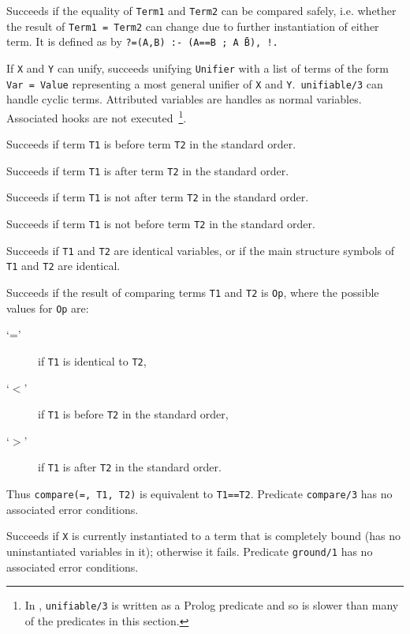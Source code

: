 \begin{description}
%
Succeeds if the equality of {\tt Term1} and {\tt Term2} can be
compared safely, i.e. whether the result of {\tt Term1 = Term2} can
change due to further instantiation of either term. It is defined as
by {\tt ?=(A,B) :- (A==B ; A \= B), !.} 

%
If {\tt X} and {\tt Y} can unify, succeeds unifying {\tt Unifier} with
a list of terms of the form {\tt Var = Value} representing a most
general unifier of {\tt X} and {\tt Y}.\  {\tt unifiable/3} can handle
cyclic terms. Attributed variables are handles as normal
variables. Associated hooks are not executed~\footnote{In \version ,
  {\tt unifiable/3} is written as a Prolog predicate and so is slower
  than many of the predicates in this section.}.

    Succeeds if term {\tt T1} is before term {\tt T2} in the standard order.

    Succeeds if term {\tt T1} is after term {\tt T2} in the standard order.

    Succeeds if term {\tt T1} is not after term {\tt T2} in the standard order.

    Succeeds if term {\tt T1} is not before term {\tt T2} in the standard order.

    Succeeds if {\tt T1} and {\tt T2} are identical variables, or if
    the main structure symbols of {\tt T1} and {\tt T2} are identical.

    Succeeds if the result of comparing terms {\tt T1} and {\tt T2} 
    is {\tt Op}, where the possible values for {\tt Op} are:
    \begin{description}
    \item[`='] if {\tt T1} is identical to {\tt T2},
    \item[`$<$'] if {\tt T1} is before {\tt T2} in the standard order,
    \item[`$>$'] if {\tt T1} is after {\tt T2} in the standard order.
    \end{description}
    Thus {\tt compare(=, T1, T2)} is equivalent to {\tt T1==T2}.
    Predicate {\tt compare/3} has no associated error conditions.

    Succeeds if {\tt X} is currently instantiated to a term that is 
    completely bound (has no uninstantiated variables in it); 
    otherwise it fails.  Predicate {\tt ground/1} has no associated 
    error conditions.


\end{description}
